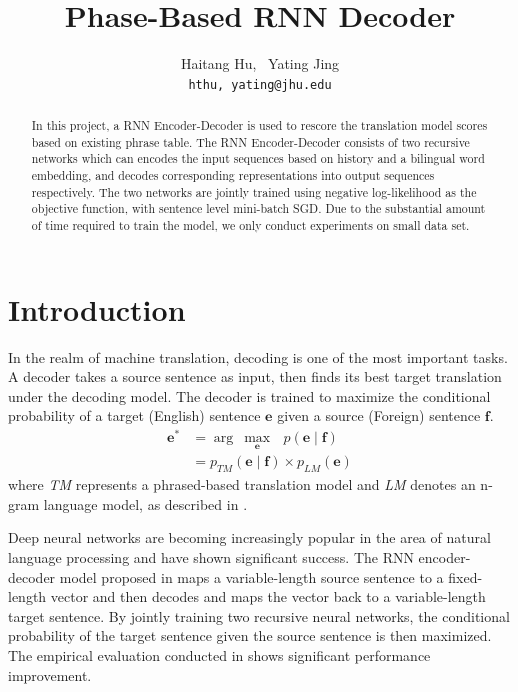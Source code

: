 \documentclass[11pt,letterpaper]{article}
\title{\huge Phase-Based RNN Decoder}
\author{Haitang Hu, \ Yating Jing\\
  \tt hthu,\,yating@jhu.edu}
\date{}
\begin{document}
\maketitle

\begin{abstract}
In this project, a RNN Encoder-Decoder is used to rescore the translation model scores based on existing phrase table. The RNN Encoder-Decoder consists of two recursive networks which can encodes the input sequences based on history and a bilingual word embedding, and decodes corresponding representations into output sequences respectively. The two networks are jointly trained using negative log-likelihood as the objective function, with sentence level mini-batch SGD. Due to the substantial amount of time required to train the model, we only conduct experiments on small data set.
\end{abstract}

\section{Introduction}
In the realm of machine translation, decoding is one of the most important tasks. A decoder takes a source sentence as input, then finds its best target translation under the decoding model. The decoder is trained to maximize the conditional probability of a target (English) sentence $\mathbf{e}$ given a source (Foreign) sentence $\mathbf{f}$. 
\begin{equation}
\begin{split}
\mathbf{e^*} &= \arg \ \underset{\mathbf{e}}{\max}\text{ } p(\mathbf{e}\mid \mathbf{f}) \\
&=  p_{TM}(\mathbf{e}\mid \mathbf{f}) \times p_{LM}(\mathbf{e})
\end{split}
\end{equation}
where \textit{TM} represents a phrased-based translation model and \textit{LM} denotes an n-gram language model, as described in \cite{phi}. 

Deep neural networks are becoming increasingly popular in the area of natural language processing and have shown significant success. The RNN encoder-decoder model proposed in \cite{rnn} maps a variable-length source sentence to a fixed-length vector and then decodes and maps the vector back to a variable-length target sentence. By jointly training two recursive neural networks, the conditional probability of the target sentence given the source sentence is then maximized. The empirical evaluation conducted in \cite{rnn} shows significant performance improvement. 
\end{document}
